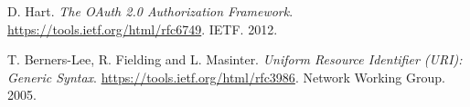 \begin{thebibliography}{9}

  D. Hart.
  \emph{The OAuth 2.0 Authorization Framework}.
  \url{https://tools.ietf.org/html/rfc6749}.
  IETF.
  2012.
 
	T. Berners-Lee, R. Fielding and L. Masinter.
	\emph{Uniform Resource Identifier (URI): Generic Syntax}.
	\url{https://tools.ietf.org/html/rfc3986}.
	Network Working Group.
	2005.

\end{thebibliography}